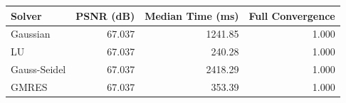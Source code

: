 \begin{tabular}{lrrr}
\toprule
Solver & PSNR (dB) & Median Time (ms) & Full Convergence\\
\midrule
Gaussian & 67.037 & 1241.85 & 1.000\\
LU & 67.037 & 240.28 & 1.000\\
Gauss-Seidel & 67.037 & 2418.29 & 1.000\\
GMRES & 67.037 & 353.39 & 1.000\\
\bottomrule
\end{tabular}
